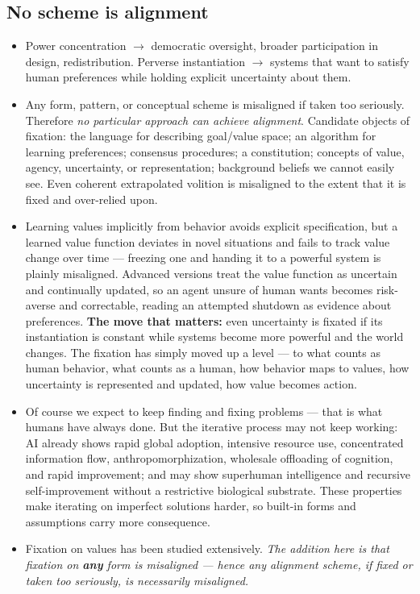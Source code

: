 \documentclass[11pt]{article}
\begin{document}
\subsection*{No scheme is alignment}

\begin{itemize}
  \item Power concentration $\rightarrow$ democratic oversight, broader participation in design, redistribution. Perverse instantiation $\rightarrow$ systems that want to satisfy human preferences while holding explicit uncertainty about them.
  \item Any form, pattern, or conceptual scheme is misaligned if taken too seriously. Therefore \textit{no particular approach can achieve alignment}. Candidate objects of fixation: the language for describing goal/value space; an algorithm for learning preferences; consensus procedures; a constitution; concepts of value, agency, uncertainty, or representation; background beliefs we cannot easily see. Even coherent extrapolated volition is misaligned to the extent that it is fixed and over-relied upon.
  \item Learning values implicitly from behavior avoids explicit specification, but a learned value function deviates in novel situations and fails to track value change over time --- freezing one and handing it to a powerful system is plainly misaligned. Advanced versions treat the value function as uncertain and continually updated, so an agent unsure of human wants becomes risk-averse and correctable, reading an attempted shutdown as evidence about preferences. \textbf{The move that matters:} even uncertainty is fixated if its instantiation is constant while systems become more powerful and the world changes. The fixation has simply moved up a level --- to what counts as human behavior, what counts as a human, how behavior maps to values, how uncertainty is represented and updated, how value becomes action.
  \item Of course we expect to keep finding and fixing problems --- that is what humans have always done. But the iterative process may not keep working: AI already shows rapid global adoption, intensive resource use, concentrated information flow, anthropomorphization, wholesale offloading of cognition, and rapid improvement; and may show superhuman intelligence and recursive self-improvement without a restrictive biological substrate. These properties make iterating on imperfect solutions harder, so built-in forms and assumptions carry more consequence.
  \item Fixation on values has been studied extensively. \textit{The addition here is that fixation on \textbf{any} form is misaligned --- hence any alignment scheme, if fixed or taken too seriously, is necessarily misaligned.}

\end{itemize}
\end{document}
